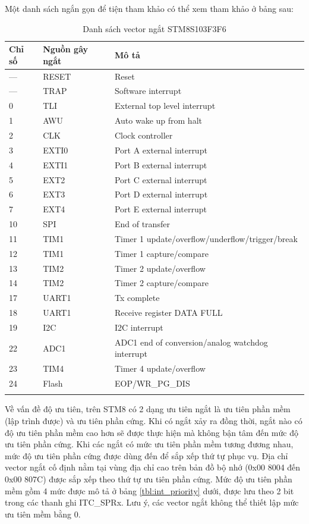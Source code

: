 Một danh sách ngắn gọn để tiện tham khảo có thể xem tham khảo ở bảng sau:
\begin{longtable}{lll}
\textbf{Chỉ số} & \textbf{Nguồn gây ngắt} & \textbf{Mô tả}\\
\midrule
\endhead
--- & RESET & Reset \\
--- & TRAP & Software interrupt \\
0 & TLI & External top level interrupt \\
1 & AWU & Auto wake up from halt \\
2 & CLK & Clock controller \\
3 & EXTI0 & Port A external interrupt \\
4 & EXTI1 & Port B external interrupt \\
5 & EXT2 & Port C external interrupt \\
6 & EXT3 & Port D external interrupt \\
7 & EXT4 & Port E external interrupt \\
10 & SPI & End of transfer \\
11 & TIM1 & Timer 1 update/overflow/underflow/trigger/break \\
12 & TIM1 & Timer 1 capture/compare \\
13 & TIM2 & Timer 2 update/overflow \\
14 & TIM2 & Timer 2 capture/compare \\
17 & UART1 & Tx complete \\
18 & UART1 & Receive register DATA FULL \\
19 & I2C & I2C interrupt \\
22 & ADC1 & ADC1 end of conversion/analog watchdog interrupt \\
23 & TIM4 & Timer 4 update/overflow \\
24 & Flash & EOP/WR\_PG\_DIS \\
\bottomrule
\caption{Danh sách vector ngắt STM8S103F3F6}
\label{tbl:stm8s_interrupts}
\end{longtable}

Về vấn đề độ ưu tiên, trên STM8 có 2 dạng ưu tiên ngắt là ưu tiên phần mềm (lập trình được) và ưu tiên phần cứng.
Khi có ngắt xảy ra đồng thời, ngắt nào có độ ưu tiên phần mềm cao hơn sẽ được thực hiện mà không bận tâm đến mức độ ưu tiên phần cứng.
Khi các ngắt có mức ưu tiên phần mềm tương đương nhau, mức độ ưu tiên phần cứng được dùng đến để sắp xếp thứ tự phục vụ.
Địa chỉ vector ngắt cố định nằm tại vùng địa chỉ cao trên bản đồ bộ nhớ (0x00 8004 đến 0x00 807C) được sắp xếp theo thứ tự ưu tiên phần cứng.
Mức độ ưu tiên phần mềm gồm 4 mức được mô tả ở bảng \ref{tbl:int_priority} dưới, được lưu theo 2 bit trong các thanh ghi ITC\_SPRx.
Lưu ý, các vector ngắt không thể thiết lập mức ưu tiên mềm bằng 0.

